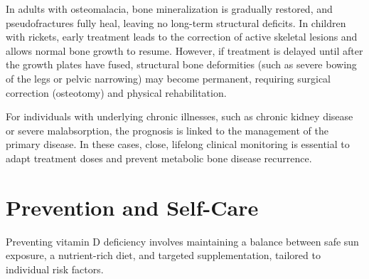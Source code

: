 In adults with osteomalacia, bone mineralization is gradually restored, and pseudofractures fully heal, leaving no long-term structural deficits. In children with rickets, early treatment leads to the correction of active skeletal lesions and allows normal bone growth to resume. However, if treatment is delayed until after the growth plates have fused, structural bone deformities (such as severe bowing of the legs or pelvic narrowing) may become permanent, requiring surgical correction (osteotomy) and physical rehabilitation.

For individuals with underlying chronic illnesses, such as chronic kidney disease or severe malabsorption, the prognosis is linked to the management of the primary disease. In these cases, close, lifelong clinical monitoring is essential to adapt treatment doses and prevent metabolic bone disease recurrence.

\section*{Prevention and Self-Care}
Preventing vitamin D deficiency involves maintaining a balance between safe sun exposure, a nutrient-rich diet, and targeted supplementation, tailored to individual risk factors.


